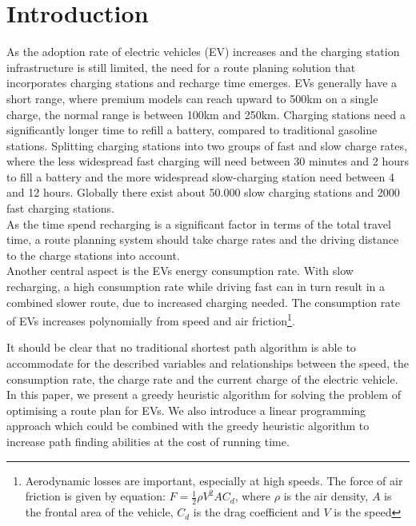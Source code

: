 \section{Introduction}

As the adoption rate of electric vehicles (EV) increases \cite{Henry2013} and the charging station infrastructure is still limited, the need for a route planing solution that incorporates charging stations and recharge time emerges. EVs generally have a short range, where premium models can reach upward to 500km on a single charge, the normal range is between 100km and 250km. Charging stations need a significantly longer time to refill a battery, compared to traditional gasoline stations. Splitting charging stations into two groups of fast and slow charge rates, where the less widespread fast charging will need between 30 minutes and 2 hours to fill a battery and the more widespread slow-charging station need between 4 and 12 hours. Globally there exist about 50.000 slow charging stations and 2000 fast charging stations\cite{Globalevoutlook}.\\
As the time spend recharging is a significant factor in terms of the total travel time, a route planning system should take charge rates and the driving distance to the charge stations into account.\\
Another central aspect is the EVs energy consumption rate. With slow recharging, a high consumption rate while driving fast can in turn result in a combined slower route, due to increased charging needed. The consumption rate of EVs increases polynomially from speed and air friction\footnote{Aerodynamic losses are important, especially at high speeds. The force of air friction is given by equation: $F = \frac{1}{2} \rho V^2 A C_d$, where $\rho$ is the air density, $A$ is the frontal area of the vehicle, $C_d$ is the drag coefficient and $V$ is the speed}.

It should be clear that no traditional shortest path algorithm is able to accommodate for the described variables and relationships between the speed, the consumption rate, the charge rate and the current charge of the electric vehicle. In this paper, we present a greedy heuristic algorithm for solving the problem of optimising a route plan for EVs. We also introduce a linear programming approach which could be combined with the greedy heuristic algorithm to increase path finding abilities at the cost of running time.  
